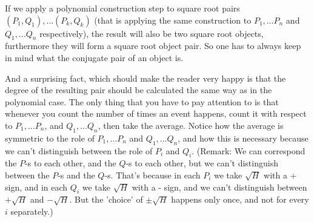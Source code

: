 \documentclass[a4paper]{article}
\begin{document}
If we apply a polynomial construction step to square root pairs $(P_1,Q_1), \ldots (P_k,Q_k)$ (that is applying the same construction to $P_1,\ldots P_n$ and $Q_1,\ldots Q_n$ respectively), the result will also be two square root objects, furthermore they will form a square root object pair. So one has to always keep in mind what the conjugate pair of an object is.

And a surprising fact, which should make the reader very happy is that the degree of the resulting pair should be calculated the same way as in the polynomial case. The only thing that you have to pay attention to is that whenever you count the number of times an event happens, count it with respect to $P_1,\ldots P_n$, and $Q_1,\ldots Q_n$, then take the average. Notice how the average is symmetric to the role of $P_1,\ldots P_n$ and $Q_1,\ldots Q_n$, and how this is necessary because we can't distinguish between the role of $P_i$ and $Q_i$. (Remark: We can correspond the $P$-s to each other, and the $Q$-s to each other, but we can't distinguish between the $P$-s and the $Q$-s. That's because in each $P_i$ we take $\sqrt{H}$ with a + sign, and in each $Q_i$ we take $\sqrt{H}$ with a - sign, and we can't distinguish between $+\sqrt{H}$ and $-\sqrt{H}$. But the 'choice' of $\pm\sqrt{H}$ happens only once, and not for every $i$ separately.)
\end{document}
